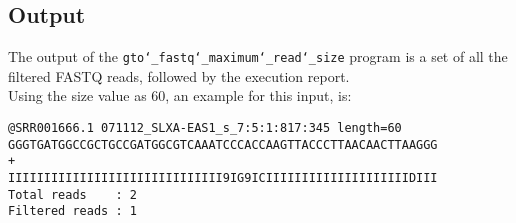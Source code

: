 \subsection*{Output}
The output of the \texttt{gto\char`_fastq\char`_maximum\char`_read\char`_size} program is a set of all the filtered FASTQ reads, followed by the execution report.\\
Using the size value as 60, an example for this input, is: 
\begin{lstlisting}
@SRR001666.1 071112_SLXA-EAS1_s_7:5:1:817:345 length=60
GGGTGATGGCCGCTGCCGATGGCGTCAAATCCCACCAAGTTACCCTTAACAACTTAAGGG
+
IIIIIIIIIIIIIIIIIIIIIIIIIIIIII9IG9ICIIIIIIIIIIIIIIIIIIIIDIII
Total reads    : 2
Filtered reads : 1
\end{lstlisting}
